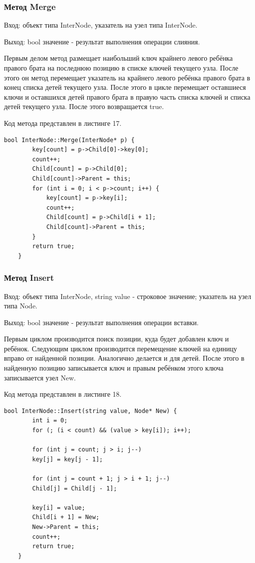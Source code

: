\documentclass[11pt,a4paper,final]{article} %
\begin{document}
\subsubsection{Метод Merge}
Вход: объект типа InterNode, указатель на узел типа InterNode. \par
Выход: bool значение - результат выполнения операции слияния. \par
Первым делом метод размещает наибольший ключ крайнего левого ребёнка правого брата на последнюю позицию в списке ключей текущего узла. После этого он метод перемещает указатель на крайнего левого ребёнка правого брата в конец списка детей текущего узла. После этого в цикле перемещает оставшиеся ключи и оставшихся детей правого брата в правую часть списка ключей и списка детей текущего узла. После этого возвращается true. \par
Код метода представлен в листинге 17.
\begin{lstlisting}[label=Merge, caption = Метод Merge]
	bool InterNode::Merge(InterNode* p) {
		key[count] = p->Child[0]->key[0];
		count++;
		Child[count] = p->Child[0];
		Child[count]->Parent = this;
		for (int i = 0; i < p->count; i++) {
			key[count] = p->key[i];
			count++;
			Child[count] = p->Child[i + 1];
			Child[count]->Parent = this;
		}
		return true;
	}
\end{lstlisting}

\subsubsection{Метод Insert}
Вход: объект типа InterNode, string value - строковое значение; указатель на узел типа Node. \par
Выход: bool значение - результат выполнения операции вставки. \par
Первым циклом производится поиск позиции, куда будет добавлен ключ и ребёнок. Следующим циклом производится перемещение ключей на единицу вправо от найденной позиции. Аналогично делается и для детей. После этого в найденную позицию записывается ключ и правым ребёнком этого ключа записывается узел New. \par
Код метода представлен в листинге 18.
\begin{lstlisting}[label=Insert, caption = Метод Insert]
	bool InterNode::Insert(string value, Node* New) {
		int i = 0;
		for (; (i < count) && (value > key[i]); i++);
		
		for (int j = count; j > i; j--)
		key[j] = key[j - 1];
		
		for (int j = count + 1; j > i + 1; j--)
		Child[j] = Child[j - 1];
		
		key[i] = value;
		Child[i + 1] = New;
		New->Parent = this;
		count++;
		return true;
	}
\end{lstlisting}
\end{document}
